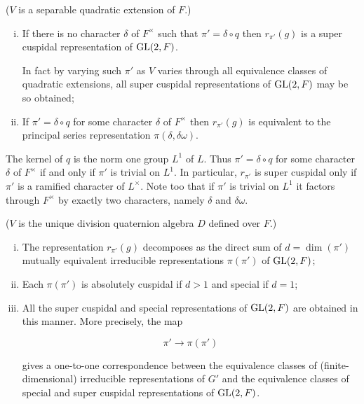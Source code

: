 \begin{theorem}\label{thm:7.4}

($V$ is a separable quadratic extension of $F$.)

\begin{enumerate}[(i)]

\item If there is no character $\delta$ of $F^{\times}$ such that $\pi' = \delta \circ q$ then $r_{\pi'}(g)$ is a super cuspidal representation of $\operatorname{GL}(2,F)$.

In fact by varying such $\pi'$ as $V$ varies through all equivalence classes of quadratic extensions, all super cuspidal representations of $\operatorname{GL}(2,F)$ may be so obtained;

\item If $\pi' = \delta \circ q$ for some character $\delta$ of $F^{\times}$ then $r_{\pi'}(g)$ is equivalent to the principal series representation $\pi(\delta, \delta\omega)$.

\end{enumerate}

\end{theorem}

\begin{remark}\label{rem:7.5}

The kernel of $q$ is the norm one group $L^1$ of $L$. Thus $\pi' = \delta \circ q$ for some character $\delta$ of $F^{\times}$ if and only if $\pi'$ is trivial on $L^1$. In particular, $r_{\pi'}$ is super cuspidal only if $\pi'$ is a ramified character of $L^{\times}$. Note too that if $\pi'$ is trivial on $L^1$ it factors through $F^{\times}$ by exactly two characters, namely $\delta$ and $\delta\omega$.

\end{remark}

\begin{theorem}\label{thm:7.6}

($V$ is the unique division quaternion algebra $D$ defined over $F$.)

\begin{enumerate}[(i)]

\item The representation $r_{\pi'}(g)$ decomposes as the direct sum of $d = \dim(\pi')$ mutually equivalent irreducible representations $\pi(\pi')$ of $\operatorname{GL}(2,F)$;

\item Each $\pi(\pi')$ is absolutely cuspidal if $d > 1$ and special if $d = 1$;

\item All the super cuspidal and special representations of $\operatorname{GL}(2,F)$ are obtained in this manner. More precisely, the map

\[
\pi' \to \pi(\pi')
\]

gives a one-to-one correspondence between the equivalence classes of (finite-dimensional) irreducible representations of $G'$ and the equivalence classes of special and super cuspidal representations of $\operatorname{GL}(2,F)$.

\end{enumerate}

\end{theorem}

